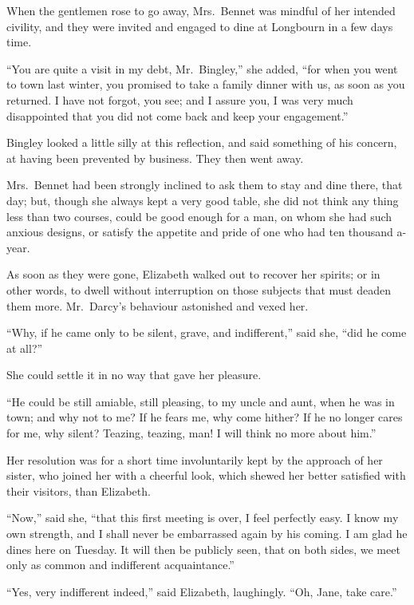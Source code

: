When the gentlemen rose to go away, Mrs.\ Bennet was
mindful of her intended civility, and they were invited
and engaged to dine at Longbourn in a few days time.

“You are quite a visit in my debt, Mr.\ Bingley,” she
added, “for when you went to town last winter, you
promised to take a family dinner with us, as soon as you
returned. I have not forgot, you see; and I assure you,
I was very much disappointed that you did not come back
and keep your engagement.”

Bingley looked a little silly at this reflection, and said
something of his concern, at having been prevented by
business. They then went away.

Mrs.\ Bennet had been strongly inclined to ask them to
stay and dine there, that day; but, though she always
kept a very good table, she did not think any thing less
than two courses, could be good enough for a man, on
whom she had such anxious designs, or satisfy the appetite
and pride of one who had ten thousand a-year.


As soon as they were gone, Elizabeth walked out to
recover her spirits; or in other words, to dwell without
interruption on those subjects that must deaden them
more. Mr.\ Darcy’s behaviour astonished and vexed her.

“Why, if he came only to be silent, grave, and indifferent,”
said she, “did he come at all?”

She could settle it in no way that gave her pleasure.

“He could be still amiable, still pleasing, to my uncle
and aunt, when he was in town; and why not to me?
If he fears me, why come hither? If he no longer cares
for me, why silent? Teazing, teazing, man! I will think
no more about him.”

Her resolution was for a short time involuntarily kept
by the approach of her sister, who joined her with a cheerful
look, which shewed her better satisfied with their
visitors, than Elizabeth.

“Now,” said she, “that this first meeting is over, I feel
perfectly easy. I know my own strength, and I shall never
be embarrassed again by his coming. I am glad he dines
here on Tuesday. It will then be publicly seen, that on
both sides, we meet only as common and indifferent
acquaintance.”

“Yes, very indifferent indeed,” said Elizabeth, laughingly.
“Oh, Jane, take care.”

